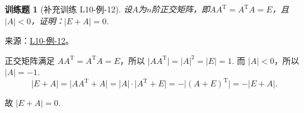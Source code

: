 \documentclass[UTF8,12pt,a4paper,fontset=fandol]{ctexart}
\newtheorem{exercise}{训练题}[section]
\begin{document}
\begin{exercise}[补充训练 L10-例-12]\label{prob:L10-例-12}
设$A$为$n$阶正交矩阵，即$AA^\mathrm{T}=A^\mathrm{T}A=E$，且$|A|<0$，证明：$|E+A|=0$.
\end{exercise}
\noindent 来源：\href{https://github.com/yhwu-is/Linear-Algebra-Left-Undone/blob/new/%E8%AE%B2%E4%B9%89/%E4%B8%93%E9%A2%98/10%20%E8%A1%8C%E5%88%97%E5%BC%8F.tex}{L10-例-12}。
\begin{solve}
正交矩阵满足 $AA^{\mathrm{T}} = A^{\mathrm{T}}A = E$，所以 $\lvert AA^{\mathrm{T}} \rvert = \lvert A \rvert^2 = \lvert E \rvert = 1$. 而 $\lvert A \rvert < 0$，所以 $\lvert A \rvert = -1$.
    \[
        \lvert E+A \rvert = \lvert AA^{\mathrm{T}}+A \rvert = \lvert A \rvert \cdot \lvert A^{\mathrm{T}}+E \rvert = -\lvert (A+E)^{\mathrm{T}} \rvert = -\lvert E+A \rvert.
    \]

    故 $\lvert E+A \rvert = 0$.
\end{solve}
\end{document}
